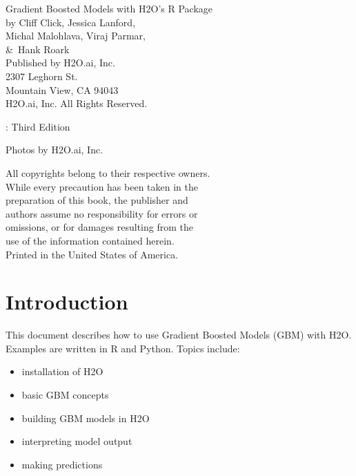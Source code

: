 {\raggedright 

Gradient Boosted Models with H2O's R Package\\

  by Cliff Click, Jessica Lanford, \\
Michal Malohlava, Viraj Parmar, \\
\&\  Hank Roark\\
\bigskip
  Published by H2O.ai, Inc. \\
2307 Leghorn St. \\
Mountain View, CA 94043\\
\bigskip
\textcopyright \the\year \hspace{1pt} H2O.ai, Inc. All Rights Reserved. 
\bigskip

\monthname \hspace{1pt}  \the\year: Third Edition 
\bigskip

Photos by \textcopyright H2O.ai, Inc.
\bigskip

All copyrights belong to their respective owners.\\
While every precaution has been taken in the\\
preparation of this book, the publisher and\\
authors assume no responsibility for errors or\\
omissions, or for damages resulting from the\\
use of the information contained herein.\\
\bigskip
Printed in the United States of America. 
}


\newpage
\thispagestyle{empty}%

\tableofcontents


\newpage

\section{Introduction}
This document describes how to use Gradient Boosted Models (GBM) with H2O.  
Examples are written in R and Python.
Topics include: 
\begin{itemize}
\item installation of H2O
\item basic GBM concepts
\item building GBM models in H2O
\item interpreting model output
\item making predictions
\end{itemize}


